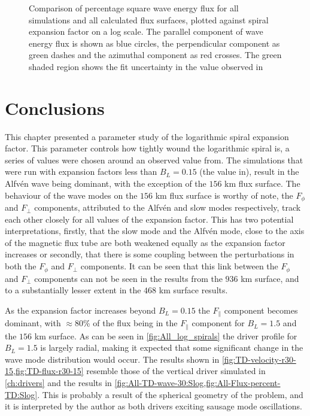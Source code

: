 \documentclass[a4paper,12pt,fourier,authoryear,custommargin]{Classes/PhDThesisPSnPDF}
\providecommand{\DIFaddtex}[1]{{\protect\color{blue}\uwave{#1}}} %
\providecommand{\DIFaddbegin}{} %
\providecommand{\DIFaddend}{} %
\providecommand{\DIFaddFL}[1]{\DIFadd{#1}} %
\providecommand{\DIFaddbeginFL}{} %
\providecommand{\DIFaddendFL}{} %
\providecommand{\DIFadd}[1]{\texorpdfstring{\DIFaddtex{#1}}{#1}} %
\begin{document}
\begin{figure}[h]
    \centering
    \caption{Comparison of percentage square wave energy flux for all simulations and all calculated flux surfaces, plotted against spiral expansion factor on a log scale. The parallel component of wave energy flux is shown as blue circles, the perpendicular component as green dashes and the azimuthal component as red crosses. The green shaded region shows the fit uncertainty in the value observed in\DIFaddbeginFL \DIFaddFL{~}\DIFaddendFL \citet{bonet2008}}
    \label{fig:expfac-flux-comparison}
\end{figure}

\section{Conclusions}

This chapter presented a parameter study of the logarithmic spiral expansion factor.
This parameter controls how tightly wound the logarithmic spiral is, a series of values were chosen around an observed value from\DIFaddbegin \DIFadd{~}\DIFaddend \cite{bonet2008}.
The simulations that were run with expansion factors less than $B_L=0.15$ (the value in\DIFaddbegin \DIFadd{~}\DIFaddend \cite{bonet2008}), result in the Alfv\'en wave being dominant, with the exception of the $156$ km flux surface.
The behaviour of the wave modes on the $156$ km flux surface is worthy of note, the $F_\phi$ and $F_\perp$ components, attributed to the Alfv\'en and slow modes respectively, track each other closely for all values of the expansion factor.
This has two potential interpretations, firstly, that the slow mode and the Alfv\'en mode, close to the axis of the magnetic flux tube are both weakened equally as the expansion factor increases or secondly, that there is some coupling between the perturbations in both the $F_\phi$ and $F_\perp$ components.
It can be seen that this link between the $F_\phi$ and $F_\perp$ components can not be seen in the results from the $936$ km surface, and to a substantially lesser extent in the $468$ km surface results.

As the expansion factor increases beyond $B_L=0.15$ the $F_\parallel$ component becomes dominant, with $\approx 80$\% of the flux being in the $F_\parallel$ component for $B_L=1.5$ and the $156$ km surface.
As can be seen in \cref{fig:All_log_spirals} the driver profile for $B_L=1.5$ is largely radial, making it expected that some significant change in the wave mode distribution would occur.
The results shown in \cref{fig:TD-velocity-r30-15,fig:TD-flux-r30-15} resemble those of the vertical driver simulated in \cref{ch:drivers} and the results in \cref{fig:All-TD-wave-30:Slog,fig:All-Flux-percent-TD:Slog}.
This is probably a result of the spherical geometry of the problem, and it is interpreted by the author as both drivers exciting sausage mode oscillations.
\end{document}
